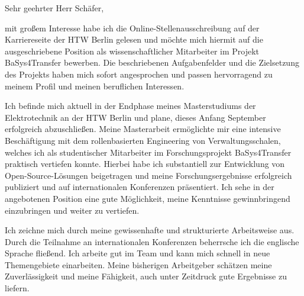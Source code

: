 \documentclass[
	12pt, %
]{letter}
\begin{document}
Sehr geehrter Herr Schäfer,

\smallskip %


mit großem Interesse habe ich die Online-Stellenausschreibung auf der Karriereseite der HTW Berlin gelesen und möchte mich hiermit auf die ausgeschriebene Position als wissenschaftlicher Mitarbeiter im Projekt BaSys4Transfer bewerben. Die beschriebenen Aufgabenfelder und die Zielsetzung des Projekts haben mich sofort angesprochen und passen hervorragend zu meinem Profil und meinen beruflichen Interessen.


Ich befinde mich aktuell in der Endphase meines Masterstudiums der Elektrotechnik an der HTW Berlin und plane, dieses Anfang September erfolgreich abzuschließen. Meine Masterarbeit ermöglichte mir eine intensive Beschäftigung mit dem rollenbasierten Engineering von Verwaltungsschalen, welches ich als studentischer Mitarbeiter im Forschungsprojekt BaSys4Transfer praktisch vertiefen konnte. Hierbei habe ich substantiell zur Entwicklung von Open-Source-Lösungen beigetragen und meine Forschungsergebnisse erfolgreich publiziert und auf internationalen Konferenzen präsentiert. Ich sehe in der angebotenen Position eine gute Möglichkeit, meine Kenntnisse gewinnbringend einzubringen und weiter zu vertiefen.

Ich zeichne mich durch meine gewissenhafte und strukturierte Arbeitsweise aus. Durch die Teilnahme an internationalen Konferenzen beherrsche ich die englische Sprache fließend. Ich arbeite gut im Team und kann mich schnell in neue Themengebiete einarbeiten. Meine bisherigen Arbeitgeber schätzen meine Zuverlässigkeit und meine Fähigkeit, auch unter Zeitdruck gute Ergebnisse zu liefern.
\end{document}

